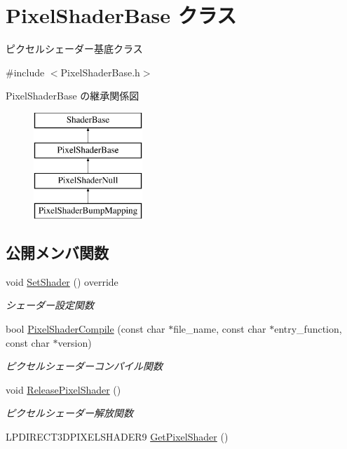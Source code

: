 \hypertarget{class_pixel_shader_base}{}\section{Pixel\+Shader\+Base クラス}
\label{class_pixel_shader_base}


ピクセルシェーダー基底クラス  




{\ttfamily \#include $<$Pixel\+Shader\+Base.\+h$>$}

Pixel\+Shader\+Base の継承関係図\begin{figure}[H]
\begin{center}
\leavevmode
\includegraphics[height=4.000000cm]{class_pixel_shader_base}
\end{center}
\end{figure}
\subsection*{公開メンバ関数}
\begin{DoxyCompactItemize}
\item 
void \mbox{\hyperlink{class_pixel_shader_base_a73f41bda5cbb9309ad415cdc471954a2}{Set\+Shader}} () override
\begin{DoxyCompactList}\small\item\em シェーダー設定関数 \end{DoxyCompactList}\item 
bool \mbox{\hyperlink{class_pixel_shader_base_ac572f1cb13a4486fc8bc2e60e5a14dc4}{Pixel\+Shader\+Compile}} (const char $\ast$file\+\_\+name, const char $\ast$entry\+\_\+function, const char $\ast$version)
\begin{DoxyCompactList}\small\item\em ピクセルシェーダーコンパイル関数 \end{DoxyCompactList}\item 
void \mbox{\hyperlink{class_pixel_shader_base_a8e00c19f5ece0a08762442f355195591}{Release\+Pixel\+Shader}} ()
\begin{DoxyCompactList}\small\item\em ピクセルシェーダー解放関数 \end{DoxyCompactList}\item 
L\+P\+D\+I\+R\+E\+C\+T3\+D\+P\+I\+X\+E\+L\+S\+H\+A\+D\+E\+R9 \mbox{\hyperlink{class_pixel_shader_base_a936a4a1e99488854ffdd4cc245134481}{Get\+Pixel\+Shader}} ()
\end{DoxyCompactItemize}


